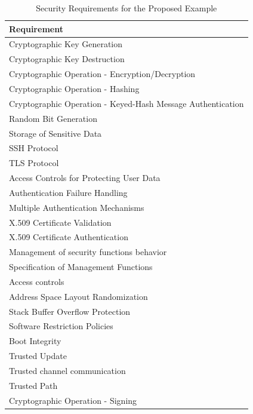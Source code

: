 \begin{table}[ht]
    \centering
    \begin{tabular}{||l||} 
     \hline
     \rowcolor{Gray}
     \textbf{Requirement} \\ [0.5ex] 
     \hline\hline
     Cryptographic Key Generation \\ 
     \hline
     Cryptographic Key Destruction \\
     \hline
     Cryptographic Operation - Encryption/Decryption \\
     \hline
     Cryptographic Operation - Hashing \\
     \hline
     Cryptographic Operation - Keyed-Hash Message Authentication\\
     \hline
     Random Bit Generation\\
     \hline
     Storage of Sensitive Data\\
     \hline
     SSH Protocol\\
     \hline
     TLS Protocol\\
     \hline
     Access Controls for Protecting User Data\\
     \hline
     Authentication Failure Handling\\
     \hline
     Multiple Authentication Mechanisms\\
     \hline
     X.509 Certificate Validation\\
     \hline
     X.509 Certificate Authentication\\
     \hline
     Management of security functions behavior\\
     \hline
     Specification of Management Functions\\
     \hline
     Access controls\\
     \hline
     Address Space Layout Randomization\\
     \hline
     Stack Buffer Overflow Protection\\
     \hline
    Software Restriction Policies\\
     \hline
     Boot Integrity\\
     \hline
     Trusted Update\\
     \hline
     Trusted channel communication\\
     \hline
     Trusted Path\\
     \hline
     Cryptographic Operation - Signing \\ [1ex] 
     \hline
    \end{tabular}
    \caption{Security Requirements for the Proposed Example}
    \label{tab:SR}
\end{table}


